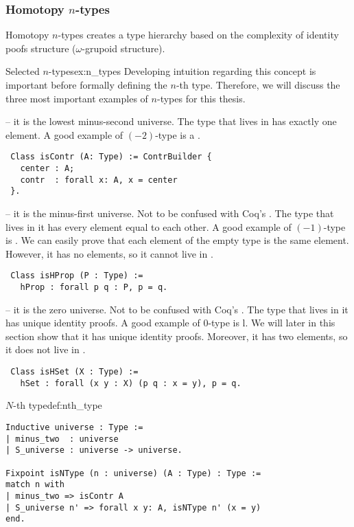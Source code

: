 \subsubsection{Homotopy $n$-types}
Homotopy $n$-types creates a type hierarchy based on the complexity of identity poofs structure ($\omega$-grupoid structure).
\begin{example}{Selected $n$-types}{ex:n_types}
Developing intuition regarding this concept is important before formally defining the $n$-th type. Therefore, we will discuss the three most important examples of $n$-types for this thesis.
\begin{description}
    \item {} -- it is the lowest minus-second universe. The type that lives in  has exactly one element. A good example of $(-2)$-type is a .
    \begin{verbatim}
 Class isContr (A: Type) := ContrBuilder {
   center : A;
   contr  : forall x: A, x = center
 }.
    \end{verbatim}
    \item {} -- it is the minus-first universe. Not to be confused with Coq's . The type that lives in it has every element equal to each other. A good example of $(-1)$-type is . We can easily prove that each element of the empty type is the same element. However, it has no elements, so it cannot live in .
        \begin{verbatim}
 Class isHProp (P : Type) :=
   hProp : forall p q : P, p = q.
    \end{verbatim}
    \item {} -- it is the zero universe. Not to be confused with Coq's . The type that lives in it has unique identity proofs. A good example of $0$-type is l. We will later in this section show that it has unique identity proofs. Moreover, it has two elements, so it does not live in .
    \begin{verbatim}
 Class isHSet (X : Type) :=
   hSet : forall (x y : X) (p q : x = y), p = q.
    \end{verbatim}
\end{description}
\end{example}
\begin{defi}{$N$-th type}{def:nth_type}
\begin{verbatim}
Inductive universe : Type :=
| minus_two  : universe
| S_universe : universe -> universe.

Fixpoint isNType (n : universe) (A : Type) : Type :=
match n with
| minus_two => isContr A
| S_universe n' => forall x y: A, isNType n' (x = y)
end.
\end{verbatim}
\end{defi}
